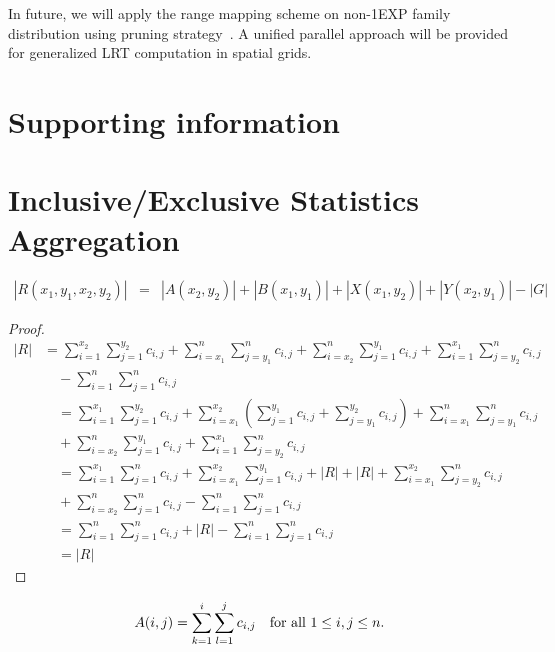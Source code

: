 \documentclass[AMA,LATO1COL]{WileyNJD-v2-bak}
\begin{document}
In future, we will apply the range mapping scheme on non-1EXP family distribution using pruning strategy~\cite{jour}. A unified parallel approach will be provided for generalized LRT computation in spatial grids.

\section*{Supporting information}

\section{Inclusive/Exclusive Statistics Aggregation }

\begin{eqnarray}
|R(x_1,y_1,x_2,y_2)|&= & |A(x_2,y_2)| + |B(x_1,y_1)| + |X(x_1,y_2)| +|Y(x_2,y_1)| - |G|
\end{eqnarray}

\begin{proof}
\begin{eqnarray}
|R|&=\sum_{i=1}^{x_2}\sum_{j=1}^{y_2}c_{i,j}+\sum_{i={x_1}}^{n}\sum_{j={y_1}}^{n}c_{i,j}+\sum_{i={x_2}}^{n}\sum_{j=1}^{y_1}c_{i,j}+\sum_{i=1}^{x_1}\sum_{j={y_2}}^{n}c_{i,j}\\& \quad-\sum_{i=1}^{n}\sum_{j=1}^{n}c_{i,j}\\&\quad=\sum_{i=1}^{x_1}\sum_{j=1}^{y_2}c_{i,j}+\sum_{i={x_1}}^{x_2}(\sum_{j=1}^{y_1}c_{i,j}+\sum_{j={y_1}}^{y_2}c_{i,j})+\sum_{i={x_1}}^{n}\sum_{j={y_1}}^{n}c_{i,j}\\& \quad +\sum_{i={x_2}}^{n}\sum_{j=1}^{y_1}c_{i,j}+\sum_{i=1}^{x_1}\sum_{j={y_2}}^{n}c_{i,j}\\&\quad=\sum_{i=1}^{x_1}\sum_{j=1}^{n}c_{i,j}+\sum_{i={x_1}}^{x_2}\sum_{j=1}^{y_1}c_{i,j}+|R|+|R|+\sum_{i={x_1}}^{x_2}\sum_{j={y_2}}^{n}c_{i,j}\\&\quad+\sum_{i={x_2}}^n\sum_{j=1}^{n}c_{i,j}-\sum_{i=1}^n\sum_{j=1}^{n}c_{i,j}
\\&\quad =\sum_{i=1}^n\sum_{j=1}^{n}c_{i,j}+|R|-\sum_{i=1}^n\sum_{j=1}^{n}c_{i,j}\\&\quad =|R|
\end{eqnarray}
\end{proof}

\begin{definition}
\begin{eqnarray}
A(i,j)=\sum_{k=1}^{i}\sum_{l=1}^{j}c_{i,j}\mbox{\quad for all $1\leq i,j\leq n$}.
\end{eqnarray}
\end{definition}
\end{document}
